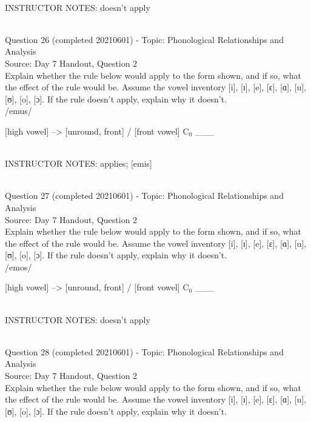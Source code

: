 \documentclass[12pt]{article}
\begin{document}
~\\
INSTRUCTOR NOTES: doesn't apply


~\\

{\large Question 26} (completed 20210601) - Topic: Phonological Relationships and Analysis\\
Source: Day 7 Handout, Question 2\\

Explain whether the rule below would apply to the form shown, and if so, what the effect of the rule would be. Assume the vowel inventory [i], [ɪ], [e], [ɛ], [ɑ], [u], [ʊ], [o], [ɔ]. If the rule doesn't apply, explain why it doesn't.\\

/emus/

{[high vowel]} --> {[unround, front]} / {[front vowel]} C$_0$ ___


~\\
INSTRUCTOR NOTES: applies; [emis]


~\\

{\large Question 27} (completed 20210601) - Topic: Phonological Relationships and Analysis\\
Source: Day 7 Handout, Question 2\\

Explain whether the rule below would apply to the form shown, and if so, what the effect of the rule would be. Assume the vowel inventory [i], [ɪ], [e], [ɛ], [ɑ], [u], [ʊ], [o], [ɔ]. If the rule doesn't apply, explain why it doesn't.\\

/emos/

{[high vowel]} --> {[unround, front]} / {[front vowel]} C$_0$ ___


~\\
INSTRUCTOR NOTES: doesn't apply


~\\

{\large Question 28} (completed 20210601) - Topic: Phonological Relationships and Analysis\\
Source: Day 7 Handout, Question 2\\

Explain whether the rule below would apply to the form shown, and if so, what the effect of the rule would be. Assume the vowel inventory [i], [ɪ], [e], [ɛ], [ɑ], [u], [ʊ], [o], [ɔ]. If the rule doesn't apply, explain why it doesn't.\\
\end{document}
